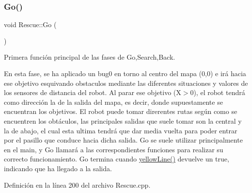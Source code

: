 \subsubsection{\texorpdfstring{Go()}{Go()}}
{\footnotesize\ttfamily void Rescue\+::\+Go (\begin{DoxyParamCaption}{ }\end{DoxyParamCaption})}



Primera función principal de las fases de Go,Search,Back. 

En esta fase, se ha aplicado un bug0 en torno al centro del mapa (0,0) e irá hacia ese objetivo esquivando obstaculos mediante las diferentes situaciones y valores de los sensores de distancia del robot. Al parar ese objetivo (X$>$0), el robot tendrá como dirección la de la salida del mapa, es decir, donde supuestamente se encuentran los objetivos. El robot puede tomar direrentes rutas según como se encuentren los obtáculos, las principales salidas que suele tomar son la central y la de abajo, el cual esta ultima tendrá que dar media vuelta para poder entrar por el pasillo que conduce hacia dicha salida. Go se suele utilizar principalmente en el main, y Go llamará a las correspondientes funciones para realizar su correcto funcionamiento. Go termina cuando \hyperlink{classRescue_ab1ea1e98e62403dc681f26529805fe2a_ab1ea1e98e62403dc681f26529805fe2a}{yellow\+Line()} devuelve un true, indicando que ha llegado a la salida. 

Definición en la línea 200 del archivo Rescue.\+cpp.


